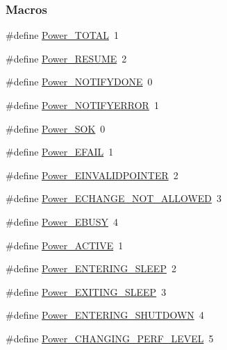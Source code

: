 \subsubsection*{Macros}
\begin{DoxyCompactItemize}
\item 
\#define \hyperlink{_power_8h_aa5e33b10202cc5a261c1800b4ae1de3e}{Power\+\_\+\+T\+O\+T\+A\+L}~1
\item 
\#define \hyperlink{_power_8h_a7343f6504f2df361dca3760a97584371}{Power\+\_\+\+R\+E\+S\+U\+M\+E}~2
\item 
\#define \hyperlink{_power_8h_a98c91c03b469de0cf4f53b89a867ee19}{Power\+\_\+\+N\+O\+T\+I\+F\+Y\+D\+O\+N\+E}~0
\item 
\#define \hyperlink{_power_8h_a98066f45fce59fd38d8edcb6f2ac96fd}{Power\+\_\+\+N\+O\+T\+I\+F\+Y\+E\+R\+R\+O\+R}~1
\item 
\#define \hyperlink{_power_8h_a92eed670a5d7e3d43f612ca0da9d3fe2}{Power\+\_\+\+S\+O\+K}~0
\item 
\#define \hyperlink{_power_8h_aed2f92a8c72bfa183e14d10a2e35789f}{Power\+\_\+\+E\+F\+A\+I\+L}~1
\item 
\#define \hyperlink{_power_8h_a0d24bacb087e8282be2e4394503a429a}{Power\+\_\+\+E\+I\+N\+V\+A\+L\+I\+D\+P\+O\+I\+N\+T\+E\+R}~2
\item 
\#define \hyperlink{_power_8h_aa4e7b580b1c9c026036bf53befe5723b}{Power\+\_\+\+E\+C\+H\+A\+N\+G\+E\+\_\+\+N\+O\+T\+\_\+\+A\+L\+L\+O\+W\+E\+D}~3
\item 
\#define \hyperlink{_power_8h_a3132904395c5631392bd6301d9a2181e}{Power\+\_\+\+E\+B\+U\+S\+Y}~4
\item 
\#define \hyperlink{_power_8h_a01074d8221d330077fbe040b9143e183}{Power\+\_\+\+A\+C\+T\+I\+V\+E}~1
\item 
\#define \hyperlink{_power_8h_a6038b3877b09c908834af7d46595b989}{Power\+\_\+\+E\+N\+T\+E\+R\+I\+N\+G\+\_\+\+S\+L\+E\+E\+P}~2
\item 
\#define \hyperlink{_power_8h_a1ea41cdfb6fb053eaed2792c4edf886d}{Power\+\_\+\+E\+X\+I\+T\+I\+N\+G\+\_\+\+S\+L\+E\+E\+P}~3
\item 
\#define \hyperlink{_power_8h_ad09d75dfaa5d799c4f044df9814db485}{Power\+\_\+\+E\+N\+T\+E\+R\+I\+N\+G\+\_\+\+S\+H\+U\+T\+D\+O\+W\+N}~4
\item 
\#define \hyperlink{_power_8h_a2b7d4ba49a9418af10c84132a8cbf108}{Power\+\_\+\+C\+H\+A\+N\+G\+I\+N\+G\+\_\+\+P\+E\+R\+F\+\_\+\+L\+E\+V\+E\+L}~5
\end{DoxyCompactItemize}
